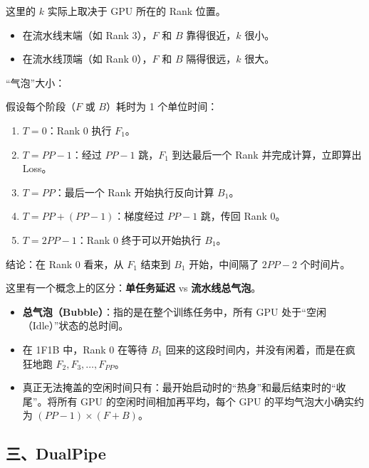 这里的 \(k\) 实际上取决于 GPU 所在的 Rank 位置。

\begin{itemize}
\tightlist
\item
  在流水线末端（如 Rank 3），\(F\) 和 \(B\) 靠得很近，\(k\) 很小。
\item
  在流水线顶端（如 Rank 0），\(F\) 和 \(B\) 隔得很远，\(k\) 很大。
\end{itemize}

``气泡''大小：

假设每个阶段（\(F\) 或 \(B\)）耗时为 1 个单位时间：

\begin{enumerate}
\def\labelenumi{\arabic{enumi}.}
\tightlist
\item
  \(T = 0\)：Rank 0 执行 \(F_1\)。
\item
  \(T = PP - 1\)：经过 \(PP - 1\) 跳，\(F_1\) 到达最后一个 Rank 并完成计算，立即算出 Loss。
\item
  \(T = PP\)：最后一个 Rank 开始执行反向计算 \(B_1\)。
\item
  \(T = PP + (PP - 1)\)：梯度经过 \(PP - 1\) 跳，传回 Rank 0。
\item
  \(T = 2PP - 1\)：Rank 0 终于可以开始执行 \(B_1\)。
\end{enumerate}

结论：在 Rank 0 看来，从 \(F_1\) 结束到 \(B_1\) 开始，中间隔了 \(2PP - 2\) 个时间片。

这里有一个概念上的区分：\textbf{单任务延迟} vs \textbf{流水线总气泡}。

\begin{itemize}
\tightlist
\item
  \textbf{总气泡（Bubble）}：指的是在整个训练任务中，所有 GPU 处于``空闲（Idle）''状态的总时间。
\item
  在 1F1B 中，Rank 0 在等待 \(B_1\) 回来的这段时间内，并没有闲着，而是在疯狂地跑 \(F_2, F_3, \dots, F_{PP}\)。
\item
  真正无法掩盖的空闲时间只有：最开始启动时的``热身''和最后结束时的``收尾''。将所有 GPU 的空闲时间相加再平均，每个 GPU 的平均气泡大小确实约为 \((PP - 1) \times (F + B)\)。
\end{itemize}

\hypertarget{ux4e09dualpipe}{%
\subsection{三、DualPipe}\label{ux4e09dualpipe}}

